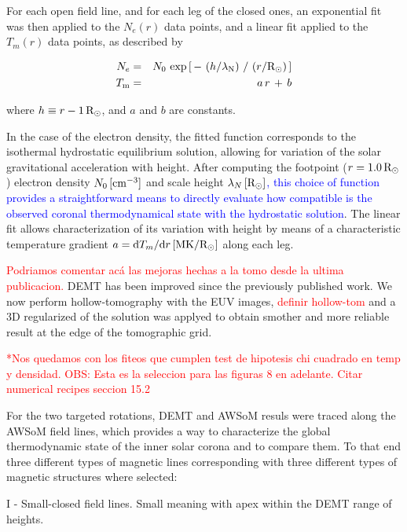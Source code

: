 \documentclass[namedreferences]{solarphysics}
\renewcommand{\l}{\lambda_{\rm N}}%
\newcommand{\mrsun}{{\rm R_\odot}}
\newcommand{\MK}{{\rm MK}}
\newcommand{\cm}{{\rm cm}}
\newcommand{\lN}{\lambda_N}
\begin{document}
\begin{article}
For each open field line, and for each leg of the closed ones, an exponential fit was then applied to the $N_e(r)$ data points, and a linear fit applied to the $T_m(r)$ data points, as described by

\begin{eqnarray}\label{Nfit}
N_e &=& N_0\,\exp{\left[\,-\,\left(h/\l\right)\,/\,\left(r/\mrsun\right)\,\right]}\\
\label{Tfit}
T_\textrm{m} &=& a\,r\,+\,b
\end{eqnarray}
 
\noindent
where $h \equiv r - 1\,\mrsun$, and $a$ and $b$ are constants. 

In the case of the electron density, the fitted function corresponds to the isothermal hydrostatic equilibrium solution, allowing for variation of the solar gravitational acceleration with height. After computing the footpoint ($r=1.0\,\mrsun$) electron density $N_{0}\,[\cm^{-3}]$ and scale height $\lN\,[\mrsun]$\textcolor{blue}{, this choice of function provides a straightforward means to directly evaluate how compatible is the observed coronal thermodynamical state with the hydrostatic solution}. The linear fit allows characterization of its variation with height by means of a characteristic temperature gradient $a = \textrm{d}T_m/\textrm{d}r\,[\MK/\mrsun]$ along each leg.


\textcolor{red}{Podriamos comentar acá las mejoras hechas a la tomo desde la ultima publicacion.}
DEMT has been improved since the previously published work. We now perform hollow-tomography with the EUV images, \textcolor{red}{definir hollow-tom} and a 3D regularized of the solution was applyed to obtain smother and more reliable result at the edge of the tomographic grid.

\textcolor{red}{*Nos quedamos con los fiteos que cumplen test de hipotesis chi cuadrado en temp y densidad.
OBS: Esta es la seleccion para las figuras 8 en adelante. Citar numerical recipes seccion 15.2}


For the two targeted rotations, DEMT and AWSoM resuls were traced along the AWSoM field lines, which provides a way to characterize the global thermodynamic state of the inner solar corona and to compare them. To that end three different types of magnetic lines corresponding with three different types of magnetic structures where selected:

  I - Small-closed field lines. Small meaning with apex within the DEMT range of heights. %


\end{article}
\end{document}
